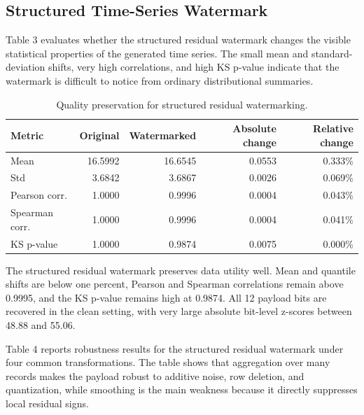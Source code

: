 \documentclass[11pt]{article}
\begin{document}
\subsection{Structured Time-Series Watermark}

Table 3 evaluates whether the structured residual watermark changes the visible statistical properties of the generated time series.
The small mean and standard-deviation shifts, very high correlations, and high KS p-value indicate that the watermark is difficult to notice from ordinary distributional summaries.

\begin{table}[H]
\centering
\caption{Quality preservation for structured residual watermarking.}
\begin{tabular}{lrrrr}
\toprule
Metric & Original & Watermarked & Absolute change & Relative change \\
\midrule
Mean & 16.5992 & 16.6545 & 0.0553 & 0.333\% \\
Std & 3.6842 & 3.6867 & 0.0026 & 0.069\% \\
Pearson corr. & 1.0000 & 0.9996 & 0.0004 & 0.043\% \\
Spearman corr. & 1.0000 & 0.9996 & 0.0004 & 0.041\% \\
KS p-value & 1.0000 & 0.9874 & 0.0075 & 0.000\% \\
\bottomrule
\end{tabular}
\end{table}

The structured residual watermark preserves data utility well.
Mean and quantile shifts are below one percent, Pearson and Spearman correlations remain above 0.9995, and the KS p-value remains high at 0.9874.
All 12 payload bits are recovered in the clean setting, with very large absolute bit-level z-scores between 48.88 and 55.06.

Table 4 reports robustness results for the structured residual watermark under four common transformations.
The table shows that aggregation over many records makes the payload robust to additive noise, row deletion, and quantization, while smoothing is the main weakness because it directly suppresses local residual signs.
\end{document}
